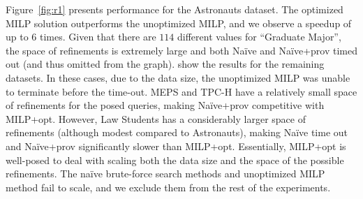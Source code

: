 Figure~\ref{fig:r1} presents performance for the Astronauts dataset. The optimized MILP solution outperforms the unoptimized MILP, and we observe a speedup of up to 6 times. Given that there are $114$ different values for ``Graduate Major'', the space of refinements is extremely large and both Na\"{i}ve and Na\"{i}ve+prov timed out (and thus omitted from the graph).  show the results for the remaining datasets. In these cases, due to the data size, the unoptimized MILP was unable to terminate before the time-out. MEPS and TPC-H have a relatively small space of refinements for the posed queries, making Na\"{i}ve+prov competitive with MILP+opt. However, Law Students has a considerably larger space of refinements (although modest compared to Astronauts), making Na\"{i}ve time out and Na\"{i}ve+prov significantly slower than MILP+opt. Essentially, MILP+opt is well-posed to deal with scaling both the data size and the space of the possible refinements.
The na\"{i}ve brute-force search methods and unoptimized MILP method fail to scale, and we exclude them from the rest of the experiments.


